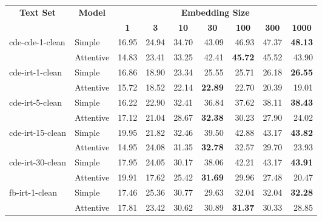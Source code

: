 \begin{tabular}{| l | l | r | r | r | r | r | r | r |}
    \hline

    \multicolumn{1}{|c|}{\multirow{2}{*}{\textbf{Text Set}}} &
    \multicolumn{1}{|c|}{\multirow{2}{*}{\textbf{Model}}} &
    \multicolumn{7}{|c|}{\textbf{Embedding Size}} \\

    &
    &
    \multicolumn{1}{|c|}{\textbf{1}} &
    \multicolumn{1}{|c|}{\textbf{3}} &
    \multicolumn{1}{|c|}{\textbf{10}} &
    \multicolumn{1}{|c|}{\textbf{30}} &
    \multicolumn{1}{|c|}{\textbf{100}} &
    \multicolumn{1}{|c|}{\textbf{300}} &
    \multicolumn{1}{|c|}{\textbf{1000}} \\

    \hline \hline

    \multirow{2}{*}{cde-cde-1-clean}
    & Simple    & 16.95 & 24.94 & 34.70 & 43.09 & 46.93 & 47.37 & \textbf{48.13} \\
    & Attentive & 14.83 & 23.41 & 33.25 & 42.41 & \textbf{45.72} & 45.52 & 43.90 \\ \hline

    \multirow{2}{*}{cde-irt-1-clean}
    & Simple    & 16.86 & 18.90 & 23.34 & 25.55 & 25.71 & 26.18 & \textbf{26.55} \\
    & Attentive & 15.72 & 18.52 & 22.14 & \textbf{22.89} & 22.70 & 20.39 & 19.01 \\ \hline

    \multirow{2}{*}{cde-irt-5-clean}
    & Simple    & 16.22 & 22.90 & 32.41 & 36.84 & 37.62 & 38.11 & \textbf{38.43} \\
    & Attentive & 17.12 & 21.04 & 28.67 & \textbf{32.38} & 30.23 & 27.90 & 24.02 \\ \hline

    \multirow{2}{*}{cde-irt-15-clean}
    & Simple    & 19.95 & 21.82 & 32.46 & 39.50 & 42.88 & 43.17 & \textbf{43.82} \\
    & Attentive & 14.95 & 24.08 & 31.35 & \textbf{32.78} & 32.57 & 29.70 & 23.93 \\ \hline

    \multirow{2}{*}{cde-irt-30-clean}
    & Simple    & 17.95 & 24.05 & 30.17 & 38.06 & 42.21 & 43.17 & \textbf{43.91} \\
    & Attentive & 19.91 & 17.62 & 25.42 & \textbf{31.69} & 29.96 & 27.48 & 20.47 \\ \hline \hline

    \multirow{2}{*}{fb-irt-1-clean}
    & Simple    & 17.46 & 25.36 & 30.77 & 29.63 & 32.04 & 32.04 & \textbf{32.28} \\
    & Attentive & 17.81 & 23.42 & 30.62 & 30.89 & \textbf{31.37} & 30.33 & 28.85 \\ \hline


\end{tabular}
